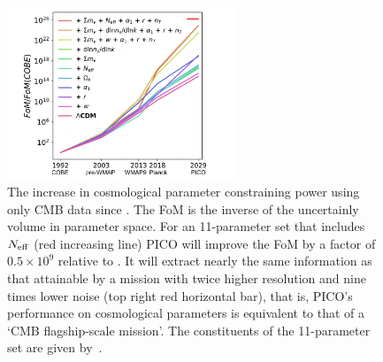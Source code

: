 \documentclass[PICOAPC.tex]{subfiles}
\begin{document}
 \begin{figure}%
\hspace{-0.2in}
\parbox{2.7in}{\centerline {
\includegraphics[width=2.7in]{images/fom_plot_CVL+del.pdf} } }
\hspace{-0.17in}
\parbox{4.1in}{
\caption{\captiontext 
The increase in cosmological parameter constraining power using only CMB data since \cobe . The FoM is the inverse of the uncertainly volume in parameter space. 
For an 11-parameter set that includes ${N_{\rm eff}}$ (red increasing line) PICO will improve the FoM by a factor of $0.5\times10^{9}$ relative to \planck . It will extract nearly the same information as that attainable by a mission with twice higher resolution and nine times lower noise (top right red horizontal bar), that is, PICO's performance on cosmological parameters is equivalent to that of a `CMB flagship-scale mission'. The constituents of the 11-parameter set are given by~\citet{pico_report}. 
\label{fig:fom} } }
\vspace{-0.13in}
\end{figure}
\end{document}
